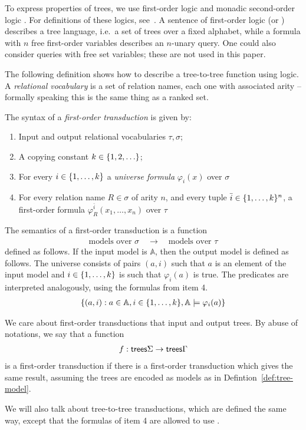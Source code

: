  To express properties of trees, we use first-order logic and monadic second-order logic \mso. For definitions of these logics, see~\cite[Section 3]{thomas1997languages}.
 A sentence of first-order logic (or \mso) describes a tree language, i.e.~a set of trees over a fixed alphabet, while a formula with $n$ free first-order variables describes an $n$-unary query.  One could also consider queries with free set variables; these are not used in this paper.

The following definition shows how to describe  a tree-to-tree function using logic. A \emph{relational vocabulary} is a set of relation names, each one with associated arity -- formally speaking this is the same thing as a ranked set. 

\begin{definition}\label{def:fo-transduction}
    The syntax of a \emph{first-order transduction}  is given by:
\begin{enumerate}
    \item Input and output relational vocabularies $\tau,\sigma$;
    \item A copying constant $k \in \{1,2,\ldots\}$;
    \item For every $i \in \{1,\ldots,k\}$ a \emph{universe formula} $\varphi_i(x)$ over $\sigma$
    \item For every relation name $R \in \sigma$ of arity $n$, and every tuple $\bar i \in \{1,\ldots,k\}^n$, a first-order formula $\varphi_R^{\bar i}(x_1,\ldots,x_n)$ over $\tau$
\end{enumerate}
\end{definition}

The semantics of a first-order transduction is  a function
\begin{align*}
    \text{models over $\sigma$} \quad \to \quad \text{models over $\tau$}
\end{align*}
defined as follows. If the input model is $\mathbb A$, then the output model is defined as follows. The universe consists of pairs $(a,i)$ such that $a$ is an element of the input model and $i \in \{1,\ldots,k\}$ is such that $\varphi_i(a)$ is true. The predicates are interpreted analogously, using the formulas from item 4. 
\begin{align*}
    \{(a,i) : a \in \mathbb A, i \in \{1,\ldots,k\} , \mathbb A \models \varphi_i(a)\}
\end{align*}

We care about first-order transductions that input and output trees. By abuse of notations, we say that a  function 
    \begin{align*}
        f : \mathsf {trees} \Sigma \to \mathsf {trees} \Gamma
    \end{align*}
    is  a first-order transduction if there is a first-order transduction which gives the same result, assuming the trees are encoded as models as in Defintion~\ref{def:tree-model}.   

    We will also talk about \mso tree-to-tree transductions, which are defined the same way, except that the formulas of item 4 are allowed to use \mso. 
